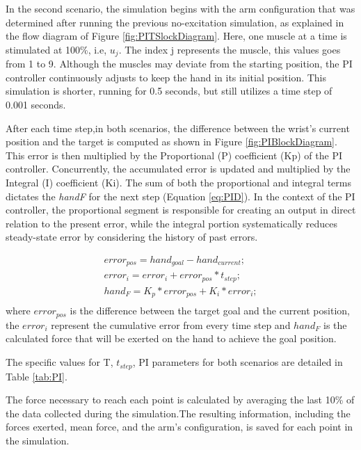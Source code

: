 In the second scenario, the simulation begins with the arm configuration that was determined after running the previous no-excitation simulation, as explained in the flow diagram of Figure \ref{fig:PITSlockDiagram}. Here, one muscle at a time is stimulated at 100\%, i.e, $u_{j}$. The index j represents the muscle, this values goes from 1 to 9. Although the muscles may deviate from the starting position, the PI controller continuously adjusts to keep the hand in its initial position. This simulation is shorter, running for 0.5 seconds, but still utilizes a time step of 0.001 seconds.

After each time step,in both scenarios, the difference between the wrist's current position and the target is computed as shown in Figure \ref{fig:PIBlockDiagram}. This error is then multiplied by the Proportional (P) coefficient (Kp) of the PI controller. Concurrently, the accumulated error is updated and multiplied by the Integral (I) coefficient (Ki).  The sum of both the proportional and integral terms dictates the \textit{handF} for the next step (Equation \ref{eq:PID}). In the context of the PI controller, the proportional segment is responsible for creating an output in direct relation to the present error, while the integral portion systematically reduces  steady-state error by considering the history of past errors.

\begin{equation} \label{eq:PID}
\begin{aligned}
        error_{pos} = hand_{goal} - hand_{current}; \\
        error_{i} = error_i + error_{pos}*t_{step}; \\
        hand_F = K_p*error_{pos} + K_i*error_i; \\
\end{aligned}
\end{equation}
where $error_{pos}$ is the difference between the target goal and the current position, the $error_i$ represent the cumulative error from every time step and $hand_F$ is the calculated force that will be exerted on the hand to achieve the goal position.

The specific values for T, $t_{step}$, PI parameters for both scenarios are detailed in Table \ref{tab:PI}.

The force necessary to reach each point is calculated by averaging the last 10\% of the data collected during the simulation.The resulting information, including the forces exerted, mean force, and the arm's configuration, is  saved for each point in the simulation.

